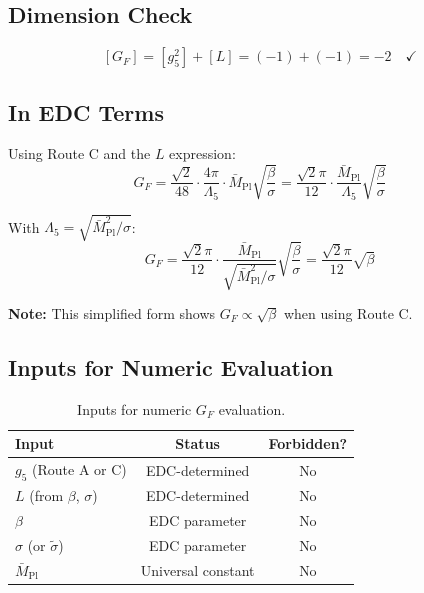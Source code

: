 \documentclass[11pt,a4paper]{article}
\begin{document}
\subsection{Dimension Check}
\label{subsec:gf-dim-check}

\begin{equation}
\label{eq:gf-dim}
[G_F] = [g_5^2] + [L] = (-1) + (-1) = -2 \quad \checkmark
\end{equation}

\subsection{In EDC Terms}
\label{subsec:gf-edc}

Using Route C and the $L$ expression:
\begin{equation}
\label{eq:gf-edc-form}
G_F = \frac{\sqrt{2}}{48} \cdot \frac{4\pi}{\Lambda_5} \cdot \bar{M}_{\text{Pl}} \sqrt{\frac{\beta}{\sigma}}
= \frac{\sqrt{2}\pi}{12} \cdot \frac{\bar{M}_{\text{Pl}}}{\Lambda_5} \sqrt{\frac{\beta}{\sigma}}
\end{equation}

With $\Lambda_5 = \sqrt{\bar{M}_{\text{Pl}}^2/\sigma}$:
\begin{equation}
\label{eq:gf-edc-simplified}
G_F = \frac{\sqrt{2}\pi}{12} \cdot \frac{\bar{M}_{\text{Pl}}}{\sqrt{\bar{M}_{\text{Pl}}^2/\sigma}} \sqrt{\frac{\beta}{\sigma}}
= \frac{\sqrt{2}\pi}{12} \sqrt{\beta}
\end{equation}

\textbf{Note:} This simplified form shows $G_F \propto \sqrt{\beta}$ when using Route C.

\subsection{Inputs for Numeric Evaluation}
\label{subsec:gf-inputs}

\begin{table}[ht]
\centering
\caption{Inputs for numeric $G_F$ evaluation.}
\label{tab:gf-inputs}
\begin{tabular}{lcc}
\toprule
Input & Status & Forbidden? \\
\midrule
$g_5$ (Route A or C) & EDC-determined & No \\
$L$ (from $\beta$, $\sigma$) & EDC-determined & No \\
$\beta$ & EDC parameter & No \\
$\sigma$ (or $\tilde{\sigma}$) & EDC parameter & No \\
$\bar{M}_{\text{Pl}}$ & Universal constant & No \\
\bottomrule
\end{tabular}
\end{table}
\end{document}

